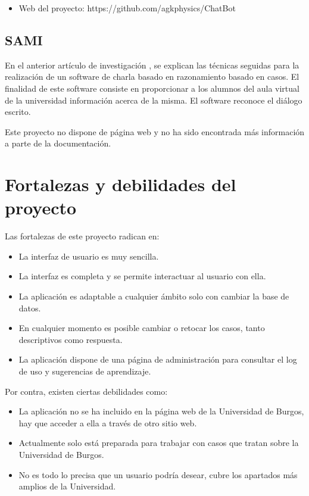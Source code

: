 \begin{itemize}
\tightlist
\item
Web del proyecto: https://github.com/agkphysics/ChatBot
\end{itemize}

\subsection{SAMI}

En el anterior artículo de investigación \cite{SAMI:project}, se explican las técnicas seguidas para la realización de un software de charla basado en razonamiento basado en casos. El finalidad de este software consiste en proporcionar a los alumnos del aula virtual de la universidad información acerca de la misma. El software reconoce el diálogo escrito.

Este proyecto no dispone de página web y no ha sido encontrada más información a parte de la documentación.

\section{Fortalezas y debilidades del proyecto}

Las fortalezas de este proyecto radican en:

\begin{itemize}
\tightlist
\item
La interfaz de usuario es muy sencilla.
\item
La interfaz es completa y se permite interactuar al usuario con ella.
\item
La aplicación es adaptable a cualquier ámbito solo con cambiar la base de datos.
\item
En cualquier momento es posible cambiar o retocar los casos, tanto descriptivos como respuesta.
\item
La aplicación dispone de una página de administración para consultar el log de uso y sugerencias de aprendizaje.
\end{itemize}

Por contra, existen ciertas debilidades como:

\begin{itemize}
\tightlist
\item
La aplicación no se ha incluido en la página web de la Universidad de Burgos, hay que acceder a ella a través de otro sitio web.
\item
Actualmente solo está preparada para trabajar con casos que tratan sobre la Universidad de Burgos.
\item
No es todo lo precisa que un usuario podría desear, cubre los apartados más amplios de la Universidad.
\end{itemize}

